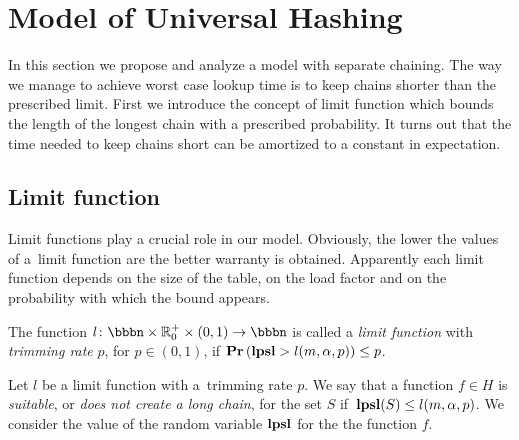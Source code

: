 \section{Model of Universal Hashing}
\label{section-model}
In this section we propose and analyze a model with separate chaining. 
The way we manage to achieve worst case lookup time is to keep chains shorter than the prescribed limit. 
First we introduce the concept of limit function which bounds the length of the longest chain with a prescribed probability. 
It turns out that the time needed to keep chains short can be amortized to a constant in expectation.

\subsection{Limit function}
Limit functions play a crucial role in our model. 
Obviously, the lower the values of a~limit function are the better warranty is obtained. 
Apparently each limit function depends on the size of the table, on the load factor and on the probability with which the bound appears.

\begin{definition}
\label{definition-limit-function}
The function $l\colon \bbbn \times \mathbb{R}_0^+ \times (0, 1) \rightarrow \bbbn$ is called a \emph{limit function} with \emph{trimming rate} $p$, for $p \in (0, 1)$, if $\mathbf{Pr}\left(\mathbf{lpsl} > l(m, \alpha, p)\right) \leq p$.

Let $l$ be a limit function with a~trimming rate $p$.
We say that a function $f \in H$ is \emph{suitable}, or \emph{does not create a long chain}, for the set $S$ if $\,\mathbf{lpsl}(S) \le l(m, \alpha, p)$. 
We consider the value of the random variable $\mathbf{lpsl}$ for the the function $f$.
\end{definition}


